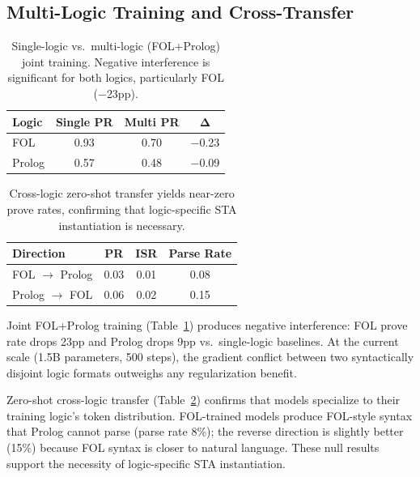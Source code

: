 \documentclass[11pt,a4paper]{article}
\begin{document}
\subsection{Multi-Logic Training and Cross-Transfer}

\begin{table}[t]
\centering
\small
\begin{tabular}{lccc}
\toprule
\textbf{Logic} & \textbf{Single PR} & \textbf{Multi PR} & $\boldsymbol{\Delta}$ \\
\midrule
FOL & 0.93 & 0.70 & $-$0.23 \\
Prolog & 0.57 & 0.48 & $-$0.09 \\
\bottomrule
\end{tabular}
\caption{Single-logic vs.\ multi-logic (FOL+Prolog) joint training. Negative interference is significant for both logics, particularly FOL ($-$23pp).}
\label{tab:multilogic}
\end{table}

\begin{table}[t]
\centering
\small
\begin{tabular}{lccc}
\toprule
\textbf{Direction} & \textbf{PR} & \textbf{ISR} & \textbf{Parse Rate} \\
\midrule
FOL $\to$ Prolog & 0.03 & 0.01 & 0.08 \\
Prolog $\to$ FOL & 0.06 & 0.02 & 0.15 \\
\bottomrule
\end{tabular}
\caption{Cross-logic zero-shot transfer yields near-zero prove rates, confirming that logic-specific STA instantiation is necessary.}
\label{tab:transfer}
\end{table}

Joint FOL+Prolog training (Table~\ref{tab:multilogic}) produces negative interference: FOL prove rate drops 23pp and Prolog drops 9pp vs.\ single-logic baselines.
At the current scale (1.5B parameters, 500 steps), the gradient conflict between two syntactically disjoint logic formats outweighs any regularization benefit.

Zero-shot cross-logic transfer (Table~\ref{tab:transfer}) confirms that models specialize to their training logic's token distribution.
FOL-trained models produce FOL-style syntax that Prolog cannot parse (parse rate 8\%); the reverse direction is slightly better (15\%) because FOL syntax is closer to natural language.
These null results support the necessity of logic-specific STA instantiation.
\end{document}
